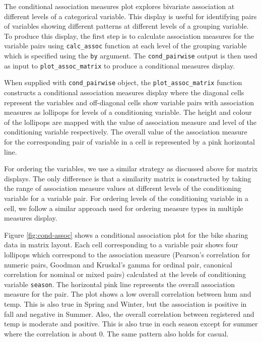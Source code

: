 The conditional association measures plot explores bivariate association at different levels of a categorical variable. This display is useful for identifying pairs of variables showing different patterns at different levels of a grouping variable. To produce this display, the first step is to calculate association measures for the variable pairs using \texttt{calc\_assoc} function at each level of the grouping variable which is specified using the \texttt{by} argument. The \texttt{cond\_pairwise} output is then used as input to \texttt{plot\_assoc\_matrix} to produce a conditional measures display.

When supplied with \texttt{cond\_pairwise} object, the \texttt{plot\_assoc\_matrix} function constructs a conditional association measures display where the diagonal cells represent the variables and off-diagonal cells show variable pairs with association measures as lollipops for levels of a conditioning variable. The height and colour of the lollipops are mapped with the value of association measure and level of the conditioning variable respectively. The overall value of the association measure for the corresponding pair of variable in a cell is represented by a pink horizontal line.

For ordering the variables, we use a similar strategy as discussed above for matrix displays. The only difference is that a similarity matrix is constructed by taking the range of association measure values at different levels of the conditioning variable for a variable pair. For ordering levels of the conditioning variable in a cell, we follow a similar approach used for ordering measure types in multiple measures display.

Figure \ref{fig:cond-assoc} shows a conditional association plot for the bike sharing data in matrix layout. Each cell corresponding to a variable pair shows four lollipops which correspond to the association measure (Pearson's correlation for numeric pairs, Goodman and Kruskal's gamma for ordinal pair, canonical correlation for nominal or mixed pairs) calculated at the levels of conditioning variable \texttt{season}. The horizontal pink line represents the overall association measure for the pair. The plot shows a low overall correlation between hum and temp. This is also true in Spring and Winter, but the association is positive in fall and negative in Summer. Also, the overall correlation between registered and temp is moderate and positive. This is also true in each season except for summer where the correlation is about 0. The same pattern also holds for casual.

